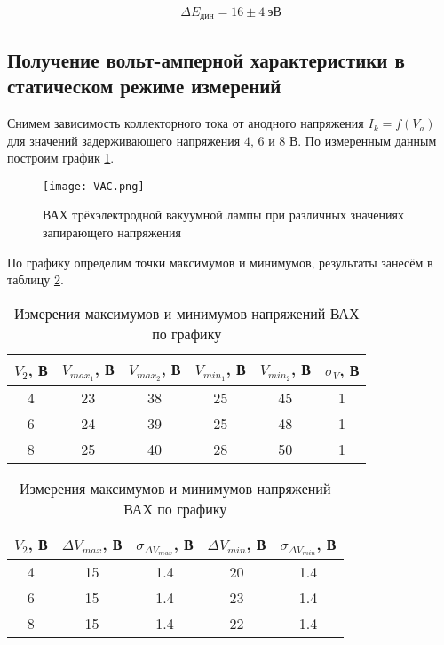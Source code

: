 \begin{equation}
  \Delta E_{дин} = 16 \pm 4 \: эВ
\end{equation}

\subsection{Получение вольт-амперной характеристики в статическом режиме измерений}

Снимем зависимость коллекторного тока от анодного напряжения $I_k = f(V_a)$ для
значений задерживающего напряжения $4$, $6$ и $8$ В. По измеренным данным
построим график \ref{img::VAC}.


\begin{figure}[h!]
  \centering
  \texttt{[image: VAC.png]}
  \captionsetup{justification=centering}
  \caption{ВАХ трёхэлектродной вакуумной лампы при различных значениях запирающего напряжения}
  \label{img::VAC}
\end{figure}

По графику определим точки максимумов и минимумов, результаты занесём в таблицу \ref{tab::stat}.

\begin{table}
  \centering
  \captionsetup{justification=centering}
  \caption{Измерения максимумов и минимумов напряжений ВАХ по графику}
  \begin{tabular}{|c|c|c|c|c|c|}
    \hline
    $V_2$, В & $V_{max_1}$, В & $V_{max_2}$, В & $V_{min_1}$, В & $V_{min_2}$, В & $\sigma_V$, В \\
    \hline
    4 & 23 & 38 & 25 & 45 & 1  \\
    \hline
    6 & 24 & 39 & 25 & 48 & 1  \\
    \hline
    8 & 25 & 40 & 28 & 50 & 1  \\
    \hline
  \end{tabular}

  \begin{tabular}{|c|c|c|c|c|}
    \hline
    $V_2$, В  & $\Delta V_{max}$, В & $\sigma_{\Delta V_{max}}$, В& $\Delta V_{min}$, В &$ \sigma_{\Delta V_{min}}$, В \\
    \hline
    4 &  15 & 1.4 & 20 & 1.4   \\
    \hline
    6 &  15 & 1.4 & 23 & 1.4   \\
    \hline
    8 &  15 & 1.4 & 22 & 1.4   \\
    \hline
  \end{tabular}

  \label{tab::stat}
\end{table}

